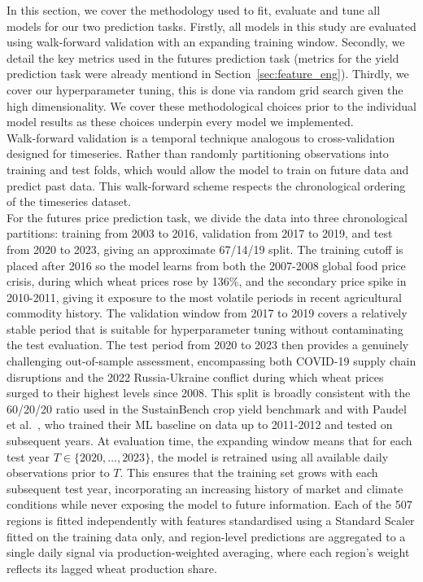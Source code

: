 \documentclass[pdflatex,sn-mathphys-num, oneside, 11pt]{sn-jnl}%
\theoremstyle{thmstyleone}%
\theoremstyle{thmstyletwo}%
\theoremstyle{thmstylethree}%
\begin{document}
In this section, we cover the methodology used to fit, evaluate and tune all 
models for our two prediction tasks. Firstly, all models in this study are 
evaluated using walk-forward validation with an expanding training window. 
Secondly, we detail the key metrics used in the futures prediction task (metrics 
for the yield prediction task were already mentiond in 
Section~\ref{sec:feature_eng}).
Thirdly, we cover our hyperparameter tuning, this is done via random grid search given the high dimensionality. We cover these methodological choices prior to the individual model results as these choices underpin every model we implemented.\\

Walk-forward validation is a temporal technique analogous to cross-validation designed 
for timeseries. Rather than randomly partitioning observations into 
training and test folds, which would allow the model to train on future 
data and predict past data. This walk-forward scheme respects the chronological 
ordering of the timeseries dataset.\\

For the futures price prediction task, we divide the data into three 
chronological partitions: training from 2003 to 2016, validation from 
2017 to 2019, and test from 2020 to 2023, giving an approximate 67/14/19 
split. The training cutoff is placed after 2016 so the model learns from 
both the 2007-2008 global food price crisis, 
during which wheat prices rose by 136\%, and the secondary price spike in 
2010-2011, giving it exposure to the most volatile periods in recent 
agricultural commodity history. The validation window from 2017 to 2019 
covers a relatively stable period that is suitable for hyperparameter 
tuning without contaminating the test evaluation. 
The test period from 2020 to 2023 then provides a genuinely challenging 
out-of-sample assessment, encompassing both COVID-19 supply chain 
disruptions and the 2022 Russia-Ukraine conflict during which wheat 
prices surged to their highest levels since 2008. This split is broadly 
consistent with the 60/20/20 ratio used in the SustainBench crop yield 
benchmark and with Paudel et al.~\cite{bib16}, 
who trained their ML baseline on data up to 2011-2012 and tested on 
subsequent years. At evaluation time, the expanding window means that 
for each test year $T \in \{2020, \ldots, 2023\}$, the model is retrained 
using all available daily observations prior to $T$. This ensures that 
the training set grows with each subsequent test year, 
incorporating an increasing history of market and climate conditions 
while never exposing the model to future information. Each of the 507 
regions is fitted independently with features standardised using a 
Standard Scaler fitted on the training data only, and region-level 
predictions are aggregated to a single daily signal via production-weighted 
averaging, where each region's weight reflects its lagged wheat production share.\\
\end{document}
